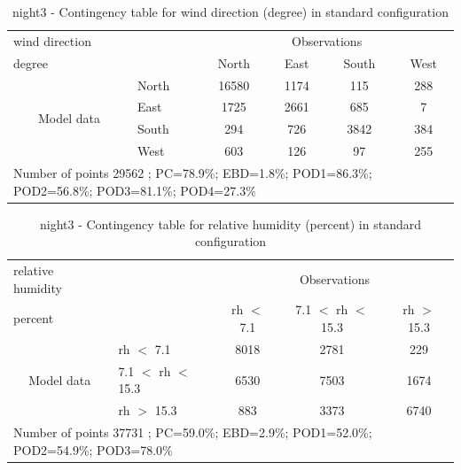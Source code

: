 \begin{table}[p!]
\begin{center}
\begin{tabular}{llcccc}
\hline
{wind direction}                                       &                             &    \multicolumn{4}{c}{Observations}                 \\
{degree}                                       &                             & {North}   & {East} & {South} & {West} \\
\hline
\multicolumn{1}{c}{\multirow{4}{*}{Model data}}  & {North}                    & 16580   & 1174    & 115     & 288\\
                                                 & {East}                     & 1725   & 2661    & 685     & 7\\
                                                 & {South}                    & 294   & 726   & 3842    & 384\\
                                                 & {West}                     & 603  & 126   & 97    & 255\\
\hline 
\multicolumn{6}{l}{ Number of points        29562 ; PC=78.9\%; EBD=1.8\%; POD1=86.3\%; POD2=56.8\%; POD3=81.1\%; POD4=27.3\%}                 \\
\end{tabular}
\end{center}
\caption{night3 - Contingency table for {wind direction} (degree) in standard configuration}
\label{tab:contingencywdBEF:night3}
\end{table}
\begin{table}[p!]
\begin{center}
\begin{tabular}{llccc}
\hline
{relative humidity}                                       &                                                    & \multicolumn{3}{c}{Observations}                 \\
{percent}                                       &                             & rh $<$ 7.1   & 7.1 $<$ rh $<$ 15.3 & rh $>$ 15.3 \\
\hline
\multicolumn{1}{c}{\multirow{3}{*}{Model data}}  & rh $<$ 7.1             & 8018                & 2781                       & 229              \\
                                                 & 7.1  $<$ rh $<$ 15.3 & 6530                & 7503                       & 1674              \\
                                                 & rh $>$ 15.3             & 883                & 3373                       & 6740              \\
\hline
\multicolumn{5}{l}{ Number of points        37731 ; PC=59.0\%; EBD=2.9\%; POD1=52.0\%; POD2=54.9\%; POD3=78.0\%}
\end{tabular}
\end{center}
\caption{night3 - Contingency table for  relative humidity (percent) in standard configuration}
\label{tab:contingencyrhBEF:night3}
\end{table}
